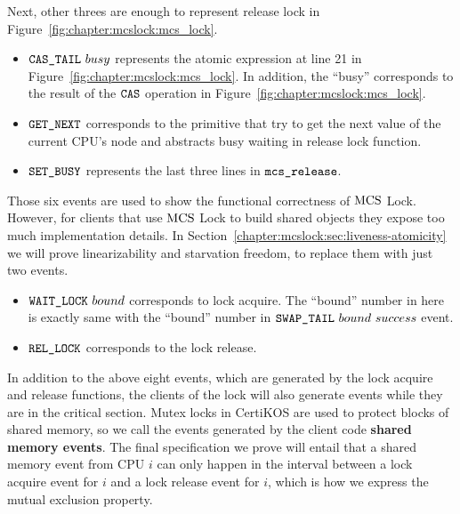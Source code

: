 Next, other threes are enough to represent release lock in Figure~\ref{fig:chapter:mcslock:mcs_lock}.

\begin{itemize}

\item \textbf{${\mathrm{\texttt{CAS\_TAIL}}}~{busy}$} represents the atomic expression at line 21  in Figure~\ref{fig:chapter:mcslock:mcs_lock}. 
In addition, the ``busy'' corresponds to the result of the ${\mathrm{\texttt{CAS}}}$ operation in Figure~\ref{fig:chapter:mcslock:mcs_lock}.

\item  \textbf{${\mathrm{\texttt{GET\_NEXT}}}$} corresponds to the primitive that try to get the next value of the current CPU's node and abstracts busy waiting in release lock function.

\item  \textbf{${\mathrm{\texttt{SET\_BUSY}}}$} represents the last three lines in ${\mathrm{\texttt{mcs\_release}}}$.
\end{itemize}

Those six events are used to show the functional correctness of
$\mathrm{MCS}$ Lock. However, for clients that use  $\mathrm{MCS}$ Lock to build shared
objects they expose too much implementation details.
In Section~\ref{chapter:mcslock:sec:liveness-atomicity} we will prove linearizability and
starvation freedom,  to replace them
with just two events.


\begin{itemize} 
\item \textbf{${\mathrm{\texttt{WAIT\_LOCK}}}~{bound}$} corresponds to lock acquire. The ``bound'' number in here is exactly same with the ``bound'' number in ${\mathrm{\texttt{SWAP\_TAIL}}}~{bound}~{success}$ event.

\item \textbf{${\mathrm{\texttt{REL\_LOCK}}}$} corresponds to the lock release.
\end{itemize}

In addition to the above eight events, which are generated by the lock
acquire and release functions, the clients of the lock will also
generate events while they are in the critical section. Mutex locks in
CertiKOS are used to protect blocks of shared memory, so we call the
events generated by the client code \textbf{shared memory events}. The
final specification we prove will entail that a shared memory event
from CPU $i$ can only happen in the interval between a lock acquire
event for $i$ and a lock release event for $i$, which is how we
express the mutual exclusion property.
